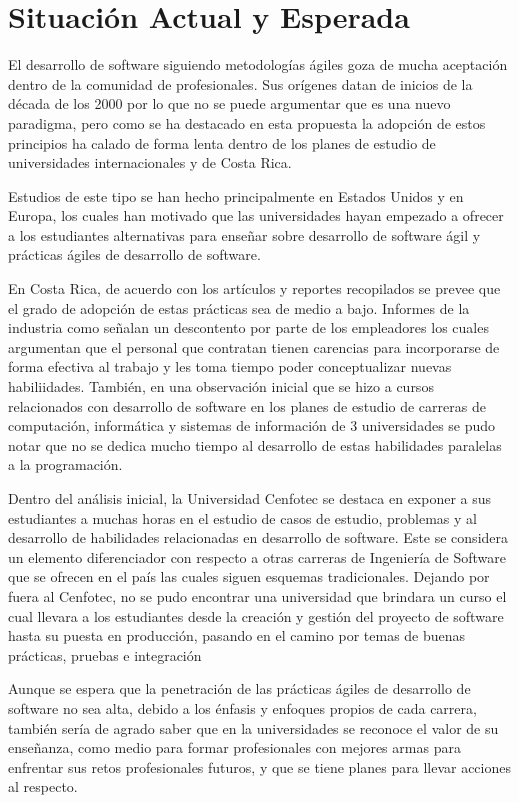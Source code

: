 \section{Situación Actual y Esperada}
El desarrollo de software siguiendo metodologías ágiles goza de mucha aceptación dentro de la comunidad de profesionales. Sus orígenes datan de inicios de la década de los 2000 por lo que no se puede argumentar que es una nuevo paradigma, pero como se ha destacado en esta propuesta la adopción  de estos principios ha calado de forma lenta dentro de los planes de estudio de universidades internacionales y de Costa Rica.

Estudios de este tipo se han hecho principalmente en Estados Unidos y en Europa, los cuales han motivado que las universidades hayan empezado a ofrecer a los estudiantes alternativas para enseñar sobre desarrollo de software ágil y prácticas ágiles de desarrollo de software.

En Costa Rica, de acuerdo con los artículos y reportes recopilados se prevee que el grado de adopción de estas prácticas sea de medio a bajo. Informes de la industria como \cite{prosic, murillo-trejos} señalan un descontento por parte de los empleadores los cuales argumentan que el personal que contratan tienen carencias para incorporarse de forma efectiva al trabajo y les toma tiempo poder conceptualizar nuevas habiliidades. También, en una observación inicial que se hizo a cursos relacionados con desarrollo de software en los planes de estudio de carreras de computación, informática y sistemas de información de 3 universidades se pudo notar que no se dedica mucho tiempo al desarrollo de estas habilidades paralelas a la programación.

Dentro del análisis inicial, la Universidad Cenfotec se destaca en exponer a sus estudiantes a muchas horas en el estudio de casos de estudio, problemas y al desarrollo de habilidades relacionadas en desarrollo de software. Este se considera un elemento diferenciador con respecto a otras carreras de Ingeniería de Software que se ofrecen en el país las cuales siguen esquemas tradicionales. Dejando por fuera al Cenfotec, no se pudo encontrar una universidad que brindara un curso el cual llevara a los estudiantes desde la creación y gestión del proyecto de software hasta su puesta en producción, pasando en el camino por temas de buenas prácticas, pruebas e integración

Aunque se espera que la penetración de las prácticas ágiles de desarrollo de software no sea alta, debido a los énfasis y enfoques propios de cada carrera, también sería de agrado saber que en la universidades se reconoce el valor de su enseñanza, como medio para formar profesionales con mejores armas para enfrentar sus retos profesionales futuros, y que se tiene planes para llevar acciones al respecto.


